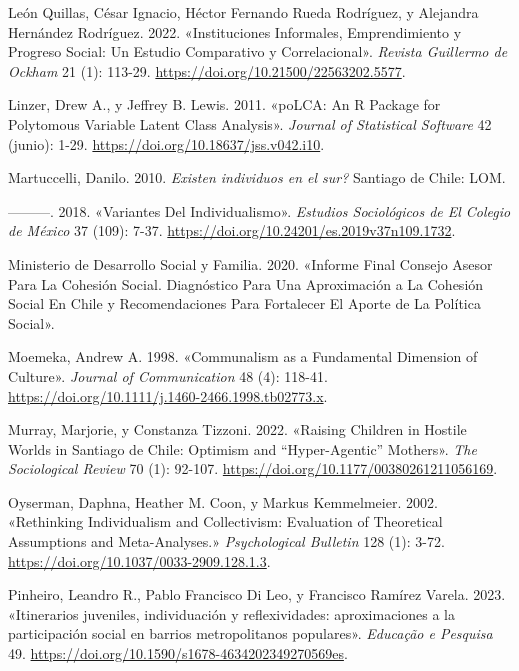 \documentclass[
  letterpaper,
  DIV=11,
  numbers=noendperiod]{scrartcl}
\newlength{\cslhangindent}
\newenvironment{CSLReferences}[2] %
 {\begin{list}{}{%
  \setlength{\itemindent}{0pt}
  \setlength{\leftmargin}{0pt}
  \setlength{\parsep}{0pt}
  \ifodd #1
   \setlength{\leftmargin}{\cslhangindent}
   \setlength{\itemindent}{-1\cslhangindent}
  \fi
  \setlength{\itemsep}{#2\baselineskip}}}
 {\end{list}}
\begin{document}
\begin{CSLReferences}{1}{0}
León Quillas, César Ignacio, Héctor Fernando Rueda Rodríguez, y
Alejandra Hernández Rodríguez. 2022. {«Instituciones Informales,
Emprendimiento y Progreso Social: Un Estudio Comparativo y
Correlacional»}. \emph{Revista Guillermo de Ockham} 21 (1): 113-29.
\url{https://doi.org/10.21500/22563202.5577}.

Linzer, Drew A., y Jeffrey B. Lewis. 2011. {«{poLCA}: {An R Package} for
{Polytomous Variable Latent Class Analysis}»}. \emph{Journal of
Statistical Software} 42 (junio): 1-29.
\url{https://doi.org/10.18637/jss.v042.i10}.

Martuccelli, Danilo. 2010. \emph{{{\textquestiondown}Existen individuos
en el sur?}} Santiago de Chile: LOM.

---------. 2018. {«Variantes Del Individualismo»}. \emph{Estudios
Sociol{ó}gicos de El Colegio de M{é}xico} 37 (109): 7-37.
\url{https://doi.org/10.24201/es.2019v37n109.1732}.

Ministerio de Desarrollo Social y Familia. 2020. {«Informe {Final
Consejo Asesor} Para La {Cohesi{ó}n Social}. {Diagn{ó}stico} Para Una
Aproximaci{ó}n a La Cohesi{ó}n Social En {Chile} y Recomendaciones Para
Fortalecer El Aporte de La Pol{í}tica Social»}.

Moemeka, Andrew A. 1998. {«Communalism as a {Fundamental Dimension} of
{Culture}»}. \emph{Journal of Communication} 48 (4): 118-41.
\url{https://doi.org/10.1111/j.1460-2466.1998.tb02773.x}.

Murray, Marjorie, y Constanza Tizzoni. 2022. {«Raising Children in
Hostile Worlds in {Santiago} de {Chile}: {Optimism} and
{``Hyper-Agentic''} Mothers»}. \emph{The Sociological Review} 70 (1):
92-107. \url{https://doi.org/10.1177/00380261211056169}.

Oyserman, Daphna, Heather M. Coon, y Markus Kemmelmeier. 2002.
{«Rethinking Individualism and Collectivism: {Evaluation} of Theoretical
Assumptions and Meta-Analyses.»} \emph{Psychological Bulletin} 128 (1):
3-72. \url{https://doi.org/10.1037/0033-2909.128.1.3}.

Pinheiro, Leandro R., Pablo Francisco Di Leo, y Francisco Ramírez
Varela. 2023. {«{Itinerarios juveniles, individuaci{ó}n y
reflexividades: aproximaciones a la participaci{ó}n social en barrios
metropolitanos populares}»}. \emph{Educa{ç}{ã}o e Pesquisa} 49.
\url{https://doi.org/10.1590/s1678-4634202349270569es}.


\end{CSLReferences}
\end{document}
